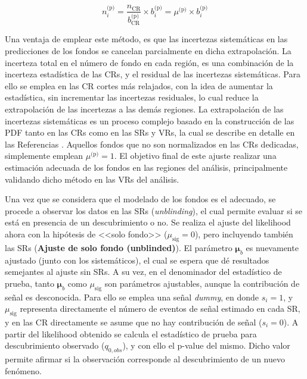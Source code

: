 

\begin{equation}
	n_i^{\text{(p)}} = \frac{n_{\text{CR}}}{b_{\text{CR}}^{\text{(p)}}} \times b_i^{\text{(p)}} = \mu^{\text{(p)}} \times b_i^{\text{(p)}}
\end{equation}

Una ventaja de emplear este método, es que las incertezas sistemáticas en las predicciones de los fondos se cancelan parcialmente en dicha extrapolación. La incerteza total en el número de fondo en cada región, es una combinación de la incerteza estadística de las CRs, y el residual de las incertezas sistemáticas. Para ello se emplea en las CR cortes más relajados, con la idea de aumentar la estadística, sin incrementar las incertezas residuales, lo cual reduce la extrapolación de las incertezas a las demás regiones. La extrapolación de las incertezas sistemáticas es un proceso complejo basado en la construcción de las PDF tanto en las CRs como en las SRs y VRs, la cual se describe en detalle en las Referencias \cite{Baak:2014wma, Cranmer:1456844}. Aquellos fondos que no son normalizados en las CRs dedicadas, simplemente emplean $\mu^{\text{(p)}}=1$. El objetivo final de este ajuste realizar una estimación adecuada de los fondos en las regiones del análisis, principalmente validando dicho método en las VRs del análisis.

Una vez que se considera que el modelado de los fondos es el adecuado, se procede a observar los datos en las SRs (\textit{unblinding}), el cual permite evaluar si se está en presencia de un descubrimiento o no. Se realiza el ajuste del likelihood ahora con la hipótesis de <<solo fondo>> ($\mu_\text{sig}=0$), pero incluyendo también las SRs (\textbf{Ajuste de solo fondo (unblinded)}). El parámetro $\bm{\mu}_b$ es nuevamente ajustado (junto con los sistemáticos), el cual se espera que dé resultados semejantes al ajuste sin SRs. A su vez, en el denominador del estadístico de prueba, tanto $\bm{\mu}_b$ como $\mu_\text{sig}$ son parámetros ajustables, aunque la contribución de señal es desconocida. Para ello se emplea una señal \textit{dummy}, en donde $s_i=1$, y $\mu_\text{sig}$ representa directamente el número de eventos de señal estimado en cada SR, y en las CR directamente se asume que no hay contribución de señal ($s_i=0$). 
A partir del likelihood obtenido se calcula el estadístico de prueba para descubrimiento observado ($q_{0, obs}$), y con ello el p-value del mismo. Dicho valor permite  afirmar si la observación corresponde al descubrimiento de un nuevo fenómeno.


